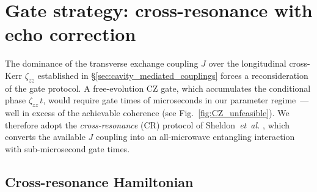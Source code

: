 
\section{Gate strategy: cross-resonance with echo correction}
\label{sec:gate_strategy}

The dominance of the transverse exchange coupling $J$ over the longitudinal
cross-Kerr $\zeta_{zz}$ established in
\S\ref{sec:cavity_mediated_couplings} forces a reconsideration of the gate
protocol. A free-evolution CZ gate, which accumulates the conditional phase
$\zeta_{zz}\,t$, would require gate times of microseconds in our parameter
regime~--- well in excess of the achievable coherence
(see Fig.~\ref{fig:CZ_unfeasible}). We therefore adopt the
\emph{cross-resonance} (CR) protocol of Sheldon~\textit{et~al.}
\cite{Sheldon2016}, which converts the available $J$ coupling into an
all-microwave entangling interaction with sub-microsecond gate times.

\subsection{Cross-resonance Hamiltonian}
\label{subsec:CR_hamiltonian}

